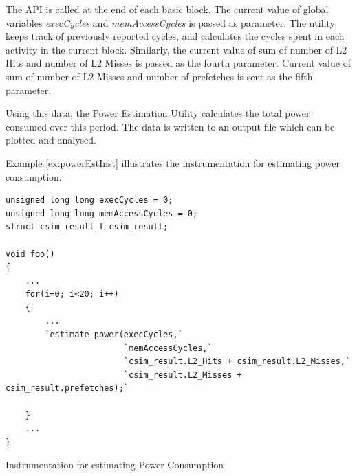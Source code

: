 The API is called at the end of each basic block. The current value of global variables \emph{execCycles} and \emph{memAccessCycles} is passed as parameter. The utility keeps track of previously reported cycles, and calculates the cycles spent in each activity in the current block. Similarly, the current value of sum of number of L2 Hits and number of L2 Misses is passed as the fourth parameter. Current value of sum of number of L2 Misses and number of prefetches is sent as the fifth parameter.

Using this data, the Power Estimation Utility calculates the total power consumed over this period. The data is written to an output file which can be plotted and analysed.

Example \ref{ex:powerEstInst} illustrates the instrumentation for estimating power consumption.

\vspace*{10pt}
\begin{Example}[h!]
\begin{lstlisting}
unsigned long long execCycles = 0;
unsigned long long memAccessCycles = 0;
struct csim_result_t csim_result;

void foo()
{
    ...
    for(i=0; i<20; i++)
    {
        ...
        `estimate_power(execCycles,`
                        `memAccessCycles,`
                        `csim_result.L2_Hits + csim_result.L2_Misses,`
                        `csim_result.L2_Misses + csim_result.prefetches);`

    }
    ...
}
\end{lstlisting}
\caption{Instrumentation for estimating Power Consumption}
\label{ex:powerEstInst}
\end{Example}
